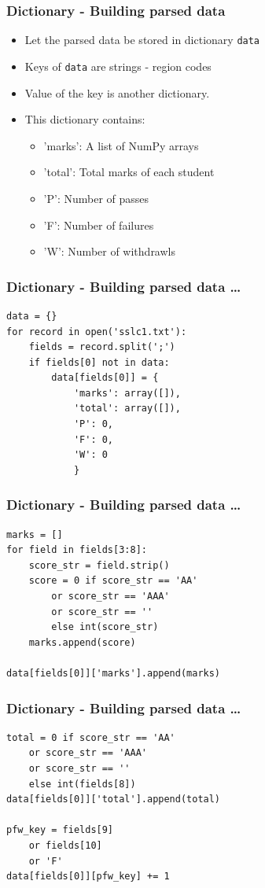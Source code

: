 \documentclass[14pt,compress]{beamer}
\newcommand{\typ}[1]{\lstinline{#1}}
\begin{document}
\begin{frame}[fragile]
  \frametitle{Dictionary - Building parsed data}
  \begin{itemize}
    \item Let the parsed data be stored in dictionary \typ{data}
    \item Keys of \typ{data} are strings - region codes
    \item Value of the key is another dictionary.
    \item This dictionary contains:
    \begin{itemize}
      \item 'marks': A list of NumPy arrays
      \item 'total': Total marks of each student
      \item 'P': Number of passes
      \item 'F': Number of failures
      \item 'W': Number of withdrawls
    \end{itemize}
  \end{itemize}
\end{frame}

\begin{frame}[fragile]
  \frametitle{Dictionary - Building parsed data \ldots}
  \small
  \begin{lstlisting}
data = {}
for record in open('sslc1.txt'):
    fields = record.split(';')
    if fields[0] not in data:
        data[fields[0]] = {
            'marks': array([]),
            'total': array([]),
            'P': 0,
            'F': 0,
            'W': 0
            }
  \end{lstlisting}
\end{frame}

\begin{frame}[fragile]
  \frametitle{Dictionary - Building parsed data \ldots}
  \begin{lstlisting}
marks = []
for field in fields[3:8]:
    score_str = field.strip()
    score = 0 if score_str == 'AA'
        or score_str == 'AAA'
        or score_str == ''
        else int(score_str)
    marks.append(score)

data[fields[0]]['marks'].append(marks)
  \end{lstlisting}
\end{frame}

\begin{frame}[fragile]
  \frametitle{Dictionary - Building parsed data \ldots}
  \begin{lstlisting}
total = 0 if score_str == 'AA'
    or score_str == 'AAA'
    or score_str == ''
    else int(fields[8])
data[fields[0]]['total'].append(total)

pfw_key = fields[9]
    or fields[10]
    or 'F'
data[fields[0]][pfw_key] += 1
  \end{lstlisting}
\end{frame}
\end{document}

